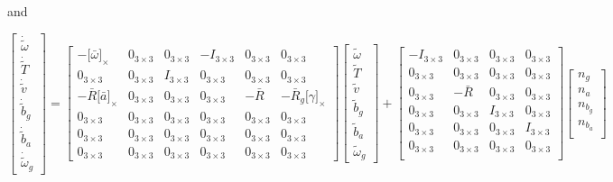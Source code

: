 \documentclass[letter,10pt]{article}
\newcommand{\asym}[1]{{\lbrack #1\rbrack}_\times{}}
\begin{document}
and

\begin{equation}
\begin{bmatrix}
\dot{\tilde \omega} \\
\dot{\tilde T}\\
\dot{\tilde v}\\
\dot{\tilde b}_g\\
\dot{\tilde b}_a\\
\dot{\tilde \omega}_g
\end{bmatrix}
= 
\begin{bmatrix}
-\asym{\bar\omega} & 0_{3\times3} & 0_{3\times3} & -I_{3\times3} & 0_{3\times3} & 0_{3\times3}\\
0_{3\times3} & 0_{3\times3} & I_{3\times3} & 0_{3\times3} & 0_{3\times3} & 0_{3\times3}\\
-\bar R\asym{\bar a} & 0_{3\times3} & 0_{3\times3} & 0_{3\times3} & -\bar R& -\bar R_g \asym{\gamma}\\
0_{3\times3} & 0_{3\times3} & 0_{3\times3} & 0_{3\times3} & 0_{3\times3}& 0_{3\times3}\\
0_{3\times3} & 0_{3\times3} & 0_{3\times3} & 0_{3\times3} & 0_{3\times3}& 0_{3\times3}\\
0_{3\times3} & 0_{3\times3} & 0_{3\times3} & 0_{3\times3} & 0_{3\times3}& 0_{3\times3}
\end{bmatrix}
\begin{bmatrix}
\tilde \omega \\
\tilde T\\
\tilde v\\
\tilde b_g\\
\tilde b_a\\
\tilde \omega_g
\end{bmatrix}
+
\begin{bmatrix}
-I_{3\times3} & 0_{3\times3}& 0_{3\times3}& 0_{3\times3}\\
0_{3\times3} & 0_{3\times3} & 0_{3\times3}& 0_{3\times3}\\
0_{3\times3} & -\bar R & 0_{3\times3}& 0_{3\times3}\\
0_{3\times3} & 0_{3\times3} & I_{3\times3}& 0_{3\times3}\\
0_{3\times3} & 0_{3\times3} & 0_{3\times3}& I_{3\times3}\\
0_{3\times3} & 0_{3\times3} & 0_{3\times3}& 0_{3\times3}\\
\end{bmatrix}
\begin{bmatrix}
 n_g\\
 n_a\\
 n_{b_g}\\
 n_{b_a}\\
\end{bmatrix}
\end{equation}
\end{document}
